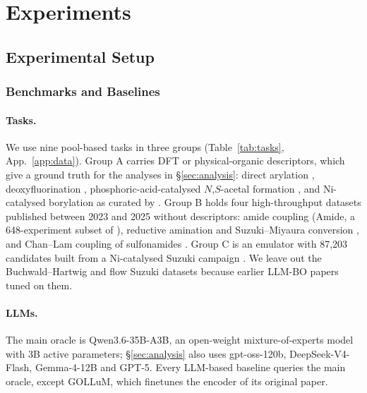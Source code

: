 \section{Experiments}
\label{sec:exp}

\subsection{Experimental Setup}
\label{sec:expsetup}

\subsubsection{Benchmarks and Baselines}
\label{sec:benchmarks}

\paragraph{Tasks.}
We use nine pool-based tasks in three groups (Table~\ref{tab:tasks}, App.~\ref{app:data}). Group A carries DFT or physical-organic descriptors, which give a ground truth for the analyses in \S\ref{sec:analysis}: direct arylation \citep[DA;][]{shields2021bayesian}, deoxyfluorination \citep[DeoxyF;][]{nielsen2018deoxyfluorination}, phosphoric-acid-catalysed $N$,$S$-acetal formation \citep[NSA;][]{zahrt2019prediction}, and Ni-catalysed borylation \citep[Boryl;][]{stevens2022borylation} as curated by \citet{schmid2025general}. Group B holds four high-throughput datasets published between 2023 and 2025 without descriptors: amide coupling (Amide, a 648-experiment subset of \citealp{zhang2025amide}), reductive amination and Suzuki--Miyaura conversion \citep[RedAm, SuzC;][]{gesmundo2023miniaturization}, and Chan--Lam coupling of sulfonamides \citep[ChanLam;][]{gandhi2025chanlam}. Group C is an emulator with 87,203 candidates built from a Ni-catalysed Suzuki campaign \citep[NiSuz;][]{schlama2025swarm}. We leave out the Buchwald--Hartwig and flow Suzuki datasets \citep{ahneman2018predicting,perera2018platform} because earlier LLM-BO papers tuned on them.

\paragraph{LLMs.}
The main oracle is Qwen3.6-35B-A3B, an open-weight mixture-of-experts model with 3B active parameters; \S\ref{sec:analysis} also uses gpt-oss-120b, DeepSeek-V4-Flash, Gemma-4-12B and GPT-5. Every LLM-based baseline queries the main oracle, except GOLLuM, which finetunes the encoder of its original paper.

